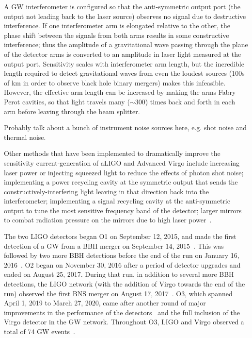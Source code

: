 A \ac{GW} interferometer is configured so that the anti-symmetric output port (the output not leading back to the laser source) observes no signal due to destructive interference. If one interferometer arm is elongated relative to the other, the phase shift between the signals from both arms results in some constructive interference; thus the amplitude of a gravitational wave passing through the plane of the detector arms is converted to an amplitude in laser light measured at the output port. Sensitivity scales with interferometer arm length, but the incredible length required to detect gravitational waves from even the loudest sources (100s of km in order to observe black hole binary mergers) makes this infeasible. However, the effective arm length can be increased by making the arms Fabry-Perot cavities, so that light travels many ($\sim300$) times back and forth in each arm before leaving through the beam splitter.

{\color{red}Probably talk about a bunch of instrument noise sources here, e.g. shot noise and thermal noise.}

Other methods that have been implemented to dramatically improve the sensitivity current-generation of \ac{aLIGO} and Advanced Virgo include increasing laser power or injecting squeezed light to reduce the effects of photon shot noise; implementing a power recycling cavity at the symmetric output that sends the constructively-interfering light leaving in that direction back into the interferometer; implementing a signal recycling cavity at the anti-symmetric output to tune the most sensitive frequency band of the detector; larger mirrors to combat radiation pressure on the mirrors due to high laser power~\citep{Creighton_2011}.

The two \ac{LIGO} detectors began \ac{O1} on September 12, 2015, and made the first detection of a \ac{GW} from a \ac{BBH} merger on September 14, 2015~\citep{gw150914}.
This was followed by two more \ac{BBH} detections before the end of the run on January 16, 2016~\citep{gwtc1}.
\Ac{O2} began on November 30, 2016 after a period of detector upgrades and ended on August 25, 2017.
During that run, in addition to several more \ac{BBH} detections, the \ac{LIGO} network (with the addition of Virgo towards the end of the run) observed the first \ac{BNS} merger on August 17, 2017~\citep{gw170817}.
\Ac{O3}, which spanned April 1, 2019 to March 27, 2020, came after another round of major improvements in the performance of the detectors~\citep{Buikema_2020} and the full inclusion of the Virgo detector in the \ac{GW} network.
Throughout \ac{O3}, \ac{LIGO} and Virgo observed a total of 74 \ac{GW} events~\citep{gwtc2,gwtc3}.
